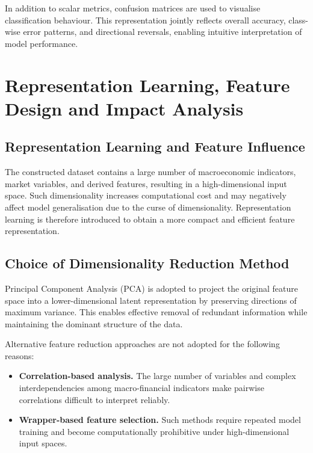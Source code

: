 \documentclass[10pt]{article} %
\begin{document}
In addition to scalar metrics, confusion matrices are used to visualise classification behaviour. This representation jointly reflects overall accuracy, class-wise error patterns, and directional reversals, enabling intuitive interpretation of model performance.

\section{Representation Learning, Feature Design and Impact Analysis}

\subsection{Representation Learning and Feature Influence}

The constructed dataset contains a large number of macroeconomic indicators, market variables, and derived features, resulting in a high-dimensional input space. Such dimensionality increases computational cost and may negatively affect model generalisation due to the curse of dimensionality. Representation learning is therefore introduced to obtain a more compact and efficient feature representation.

\subsection{Choice of Dimensionality Reduction Method}

Principal Component Analysis (PCA) is adopted to project the original feature space into a lower-dimensional latent representation by preserving directions of maximum variance. This enables effective removal of redundant information while maintaining the dominant structure of the data.

Alternative feature reduction approaches are not adopted for the following reasons:

\begin{itemize}
    \item \textbf{Correlation-based analysis.} 
    The large number of variables and complex interdependencies among macro-financial indicators make pairwise correlations difficult to interpret reliably.

    \item \textbf{Wrapper-based feature selection.} 
    Such methods require repeated model training and become computationally prohibitive under high-dimensional input spaces.
\end{itemize}
\end{document}
